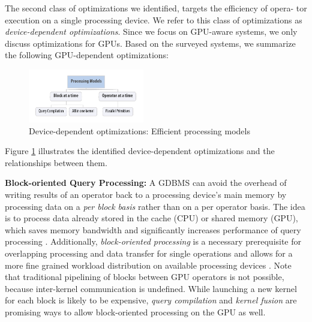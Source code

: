 \documentclass[twocolumn]{article}
\begin{document}
The second class of optimizations we identified, targets the efficiency of opera- tor execution on a single processing device. We refer to this class of optimizations as \textit{device-dependent optimizations}. 
Since we focus on GPU-aware systems, we only discuss optimizations for GPUs. 
Based on the surveyed systems, we summarize the following GPU-dependent optimizations:
\begin{figure}[htb]
        \centering
        \includegraphics[width=0.45\textwidth]{device-dependent-tree.pdf}
        \caption{Device-dependent optimizations: Efficient processing models}
        \label{fig:device-dependent-tree}
\end{figure}
Figure \ref{fig:device-dependent-tree} illustrates the identified device-dependent optimizations and the relationships between them.

\noindent
\textbf{Block-oriented Query Processing:} 
A GDBMS can avoid the overhead of writing results of an operator back to a processing device’s main memory by processing data on a \textit{per block basis} rather than on a per operator basis. 
The idea is to process data already stored in the cache (CPU) or shared memory (GPU), which saves memory bandwidth and significantly increases performance of query processing \cite{Yuan:2013}. 
Additionally, \textit{block-oriented processing} is a necessary prerequisite for overlapping processing and data transfer for single operations and allows for a more fine grained workload distribution on available processing devices \cite{Zhang:2013}. 
Note that traditional pipelining of blocks between GPU operators is not possible, because inter-kernel communication is undefined. 
While launching a new kernel for each block is likely to be expensive, \textit{query compilation} and \textit{kernel fusion} are promising ways to allow block-oriented processing on the GPU as well.
\end{document}
